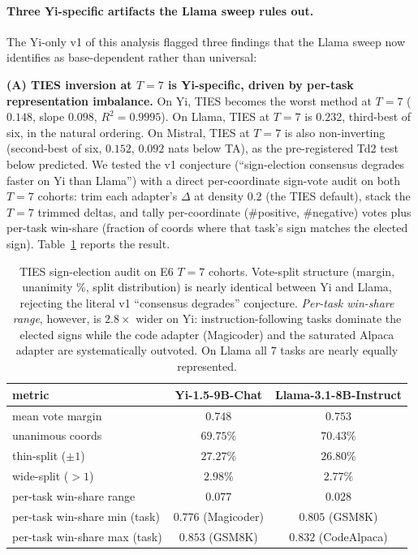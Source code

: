 \paragraph{Three Yi-specific artifacts the Llama sweep rules out.}
The Yi-only v1 of this analysis flagged three findings that the
Llama sweep now identifies as base-dependent rather than universal:

\textbf{(A) TIES inversion at $T = 7$ is Yi-specific, driven by
per-task representation imbalance.} On Yi, TIES becomes the worst
method at $T = 7$ ($0.148$, slope $0.098$, $R^2 = 0.9995$). On
Llama, TIES at $T = 7$ is $0.232$, third-best of six, in the
natural ordering. On Mistral, TIES at $T = 7$ is also non-inverting
(second-best of six, $0.152$, $0.092$ nats below TA), as the
pre-registered Td2 test below predicted. We tested the v1 conjecture (``sign-election
consensus degrades faster on Yi than Llama'') with a direct
per-coordinate sign-vote audit on both $T = 7$ cohorts: trim each
adapter's $\Delta$ at density $0.2$ (the TIES default), stack the
$T = 7$ trimmed deltas, and tally per-coordinate (\#positive,
\#negative) votes plus per-task win-share (fraction of coords where
that task's sign matches the elected sign).
Table~\ref{tab:ties-probe} reports the result.

\begin{table}[t]
\centering
\caption{TIES sign-election audit on E6 $T = 7$ cohorts. Vote-split
structure (margin, unanimity \%, split distribution) is nearly
identical between Yi and Llama, rejecting the literal v1
``consensus degrades'' conjecture. \emph{Per-task win-share range},
however, is $2.8 \times$ wider on Yi: instruction-following tasks
dominate the elected signs while the code adapter (Magicoder) and
the saturated Alpaca adapter are systematically outvoted. On Llama
all $7$ tasks are nearly equally represented.}
\label{tab:ties-probe}
\begin{tabular}{lcc}
\hline
metric & Yi-1.5-9B-Chat & Llama-3.1-8B-Instruct \\
\hline
mean vote margin & $0.748$ & $0.753$ \\
unanimous coords & $69.75\%$ & $70.43\%$ \\
thin-split ($\pm 1$) & $27.27\%$ & $26.80\%$ \\
wide-split ($> 1$) & $2.98\%$ & $2.77\%$ \\
per-task win-share range & $\mathbf{0.077}$ & $\mathbf{0.028}$ \\
per-task win-share min (task) & $0.776$ (Magicoder) & $0.805$ (GSM8K) \\
per-task win-share max (task) & $0.853$ (GSM8K) & $0.832$ (CodeAlpaca) \\
\hline
\end{tabular}
\end{table}

